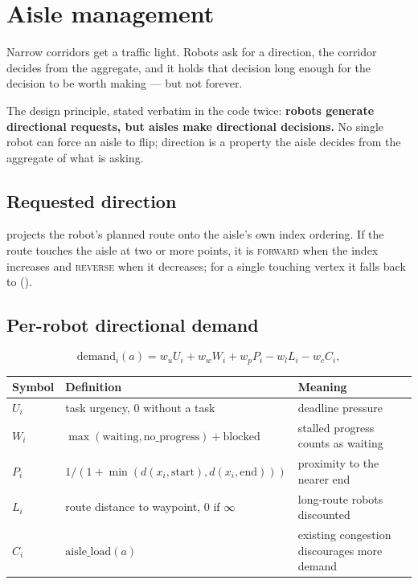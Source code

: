 \section{Aisle management}
\label{sec:aisles}

\begin{lede}
Narrow corridors get a traffic light. Robots ask for a direction, the corridor
decides from the aggregate, and it holds that decision long enough for the
decision to be worth making --- but not forever.
\end{lede}

The design principle, stated verbatim in the code twice: \textbf{robots
generate directional requests, but aisles make directional decisions.} No
single robot can force an aisle to flip; direction is a property the aisle
decides from the aggregate of what is asking.

\subsection{Requested direction}

 projects the robot's planned route
onto the aisle's own index ordering. If the route touches the aisle at two or
more points, it is \textsc{forward} when the index increases and
\textsc{reverse} when it decreases; for a single touching vertex it falls back
to  ().

\subsection{Per-robot directional demand}
\label{sec:aisle-demand}

\begin{equation}
  \mathrm{demand}_i(a) = w_u U_i + w_w W_i + w_p P_i - w_l L_i - w_c C_i,
  \label{eq:demand}
\end{equation}

\begin{center}\small
\begin{tabular}{@{}lll@{}}
\toprule
\textbf{Symbol} & \textbf{Definition} & \textbf{Meaning} \\
\midrule
$U_i$ & task urgency, 0 without a task & deadline pressure \\
$W_i$ & $\max(\text{waiting}, \text{no\_progress}) + \text{blocked}$ & stalled progress counts as waiting \\
$P_i$ & $1 / (1 + \min(d(x_i, \text{start}), d(x_i, \text{end})))$ & proximity to the nearer end \\
$L_i$ & route distance to waypoint, 0 if $\infty$ & long-route robots discounted \\
$C_i$ & $\mathrm{aisle\_load}(a)$ & existing congestion discourages more demand \\
\bottomrule
\end{tabular}
\end{center}

